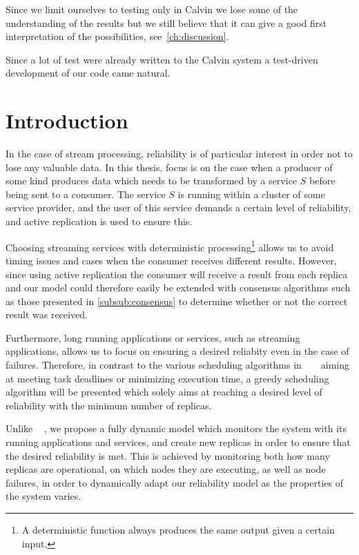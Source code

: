 \documentclass{cslthse-msc}
\begin{document}
Since we limit ourselves to testing only in Calvin we lose some of the understanding of the results but we still believe that it can give a good first interpretation of the possibilities, see~\cref{ch:discussion}. 

Since a lot of test were already written to the Calvin system a test-driven development of our code came natural.

\section{Introduction} \label{sec:design_intro}
In the case of stream processing, reliability is of particular interest in order not to lose any valuable data. In this thesis, focus is on the case when a producer of some kind produces data which needs to be transformed by a service $S$ before being sent to a consumer. The service $S$ is running within a cluster of some service provider, and the user of this service demands a certain level of reliability, and active replication is used to ensure this.	

Choosing streaming services with deterministic processing\footnote{A deterministic function always produces the same output given a certain input.} allows us to avoid timing issues and cases when the consumer receives different results. However, since using active replication the consumer will receive a result from each replica and our model could therefore easily be extended with consensus algorithms such as those presented in \cref{subsub:consensus} to determine whether or not the correct result was received. 

Furthermore, long running applications or services, such as streaming applications, allows us to focus on ensuring a desired reliabity even in the case of failures. Therefore, in contrast to the various scheduling algorithms in ~\cite{algoOptTimeMaxRel} \cite{optTaskAllocationForMaxRel} \cite{taskAllocation} \cite{taskAllocationSwarm} \cite{algoMaxRelEndToEndConstraint} \cite{algoMinExTime}~\cite{schedReplicas} aiming at meeting task deadlines or minimizing execution time, a greedy scheduling algorithm will be presented which solely aims at reaching a desired level of reliability with the minimum number of replicas.

Unlike ~\cite{designFaultTolerantSched}  \cite{evalReplicationSched} \cite{taskSchedulingReplication} \cite{effTaskReplMobGrid} \cite{relGridServicePredConstraint}, we propose a fully dynamic model which monitors the system with its running applications and services, and create new replicas in order to ensure that the desired reliability is met. This is achieved by monitoring both how many replicas are operational, on which nodes they are executing, as well as node failures, in order to dynamically adapt our reliability model as the properties of the system varies.
\end{document}
